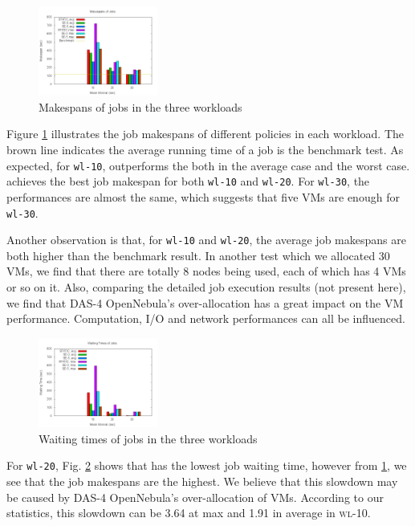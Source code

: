 \begin{figure}[!t]
\centering
\includegraphics[width=0.35\textwidth]{pictures/all-makespans.png}
\caption{Makespans of jobs in the three workloads}
\label{figure_jobmakespan}
\end{figure}

Figure \ref{figure_jobmakespan} illustrates the job makespans of different
policies in each workload. The brown line indicates the average running time
of a job is the benchmark test. As expected, for \texttt{wl-10},
\SE{} outperforms the \STATIC{} both in the average case
and the worst case. \SEfive{} achieves the best job makespan for both
\texttt{wl-10} and \texttt{wl-20}. For \texttt{wl-30}, the performances are
almost the same, which suggests that five VMs are enough for \texttt{wl-30}.

Another observation is that, for \texttt{wl-10} and \texttt{wl-20}, the
average job makespans are both higher than the benchmark result. In another
test which we allocated 30 VMs, we find that there are totally 8 nodes being
used, each of which has 4 VMs or so on it. Also, comparing the detailed
job execution results (not present here), we find that DAS-4 OpenNebula's
over-allocation has a great impact on the VM performance. Computation, I/O
and network performances can all be influenced.

\begin{figure}[!t]
\centering
\includegraphics[width=0.35\textwidth]{pictures/all-waittimes.png}
\caption{Waiting times of jobs in the three workloads}
\label{figure_jobwaittime}
\end{figure}

For \texttt{wl-20}, Fig. \ref{figure_jobwaittime} shows that \SEzero{} has
the lowest job waiting time, however from \ref{figure_jobmakespan}, we
see that the job makespans are the highest. We believe that this slowdown
may be caused by DAS-4 OpenNebula's over-allocation of VMs. According to
our statistics, this slowdown can be 3.64 at max and 1.91 in average in
\textsc{wl-10}.


